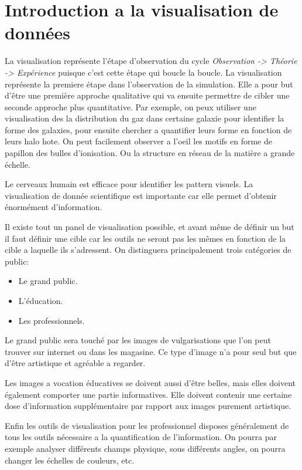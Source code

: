 \section{Introduction a la visualisation de données}

La visualisation représente l'étape d'observation du cycle \textit{Observation -> Théorie -> Expérience} puisque c'est cette étape qui boucle la boucle.
La visualisation représente la premiere étape dans l'observation de la simulation.
Elle a pour but d'être une première approche qualitative qui va ensuite permettre de cibler une seconde approche plus quantitative.
Par exemple, on peux utiliser une visualisation des la distribution du gaz dans certaine galaxie pour identifier la forme des galaxies, pour ensuite chercher a quantifier leurs forme en fonction de leurs halo hote.
On peut facilement observer a l'oeil les motifs en forme de papillon des bulles d'ionisation.
Ou la structure en réseau de la matière a grande échelle.

Le cerveaux humain est efficace pour identifier les pattern visuels. 
La visualisation de donnée scientifique est importante car elle permet d'obtenir énormément d'information.



Il existe tout un panel de visualisation possible, et avant même de définir un but il faut définir une cible car les outils ne seront pas les mêmes en fonction de la cible a laquelle ils s'adressent.
On distinguera principalement trois catégories de public:

\begin{itemize}
\item Le grand public.
\item L'éducation.
\item Les professionnels.
\end{itemize}

Le grand public sera touché par les images de vulgarisations que l'on peut trouver sur internet ou dans les magasine.
Ce type d'image n'a pour seul but que d'être artistique et agréable a regarder.

Les images a vocation éducatives se doivent aussi d'être belles, mais elles doivent également comporter une partie informatives.
Elle doivent contenir une certaine dose d'information supplémentaire par rapport aux images purement artistique.

Enfin les outils de visualisation pour les professionnel disposes généralement de tous les outils nécessaire a la quantification de l'information.
On pourra par exemple analyser différents champs physique, sous différents angles, on pourra changer les échelles de couleurs, etc.

